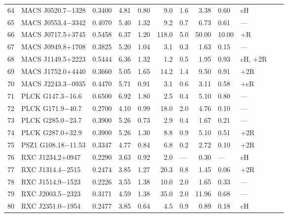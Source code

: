 \begin{ThreePartTable}
\begin{longtable}{clcccr@{$\,\pm\,$}lr@{$\,\pm\,$}llll}
64 & MACS J0520.7$-$1328   & 0.3400 & 4.81 & 0.80 &   9.0 &  1.6          &  3.38 &  0.60 & cH  & \parencite{macario2014}  \\
65 & MACS J0553.4$-$3342   & 0.4070 & 5.40 & 1.32 &   9.2 &  0.7\tnote{b} &  6.73 &  0.61 & --- & \parencite{bonafede2012}  \\
66 & MACS J0717.5$+$3745   & 0.5458 & 6.37 & 1.20 & 118.0 &  5.0          & 50.00 & 10.00 & +R  & \parencite{vanWeeren2009}  \\
67 & MACS J0949.8$+$1708   & 0.3825 & 5.20 & 1.04 &   3.1 &  0.3\tnote{b} &  1.63 &  0.15 & --- & \parencite{bonafede2015}  \\
68 & MACS J1149.5$+$2223   & 0.5444 & 6.36 & 1.32 &   1.2 &  0.5          &  1.95 &  0.93 & cH, +2R & \parencite{bonafede2012}  \\
69 & MACS J1752.0$+$4440   & 0.3660 & 5.05 & 1.65 &  14.2 &  1.4\tnote{m} &  9.50 &  0.91 & +2R & \parencite{vanWeeren2012}  \\
70 & MACS J2243.3$-$0935   & 0.4470 & 5.71 & 0.91 &   3.1 &  0.6\tnote{n} &  3.11 &  0.58 & +cR & \parencite{cantwell2016}  \\
71 & PLCK G147.3$-$16.6    & 0.6500 & 6.92 & 1.80 &   2.5 &  0.4\tnote{o} &  5.10 &  0.80 & --- & \parencite{vanWeeren2014}  \\
72 & PLCK G171.9$-$40.7    & 0.2700 & 4.10 & 0.99 &  18.0 &  2.0          &  4.76 &  0.10 & --- & \parencite{giacintucci2013}  \\
73 & PLCK G285.0$-$23.7    & 0.3900 & 5.26 & 0.73 &   2.9 &  0.4\tnote{p} &  1.67 &  0.21 & --- & \parencite{martinezAviles2016}  \\
74 & PLCK G287.0$+$32.9    & 0.3900 & 5.26 & 1.30 &   8.8 &  0.9          &  5.10 &  0.51 & +2R & \parencite{bonafede2014a}  \\
75 & PSZ1 G108.18$-$11.53  & 0.3347 & 4.77 & 0.84 &   6.8 &  0.2          &  2.72 &  0.10 & +2R & \parencite{deGasperin2015}  \\
76 & RXC J1234.2$+$0947    & 0.2290 & 3.63 & 0.92 &   2.0 &  ---          &  0.30 &  ---  & cH  & \parencite{govoni2012}  \\
77 & RXC J1314.4$-$2515    & 0.2474 & 3.85 & 1.27 &  20.3 &  0.8          &  1.45 &  0.06 & +2R & \parencite{feretti2005}  \\
78 & RXC J1514.9$-$1523    & 0.2226 & 3.55 & 1.38 &  10.0 &  2.0          &  1.65 &  0.33 & --- & \parencite{giacintucci2011a}  \\
79 & RXC J2003.5$-$2323    & 0.3171 & 4.59 & 1.38 &  35.0 &  2.0          & 11.96 &  0.68 & --- & \parencite{giacintucci2009}  \\
80 & RXC J2351.0$-$1954    & 0.2477 & 3.85 & 0.64 &   4.5 &  0.9\tnote{q} &  0.89 &  0.18 & cH  & \parencite{duchesne2017}  \\
\end{longtable}

\end{ThreePartTable}

